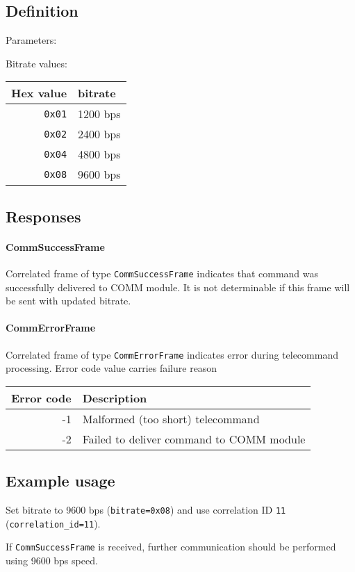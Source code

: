 \subsection{Definition}

Parameters: 

\begin{tcarglist}	
\end{tcarglist}

Bitrate values:

\begin{tabular}{r | l}
	Hex value & bitrate \\ \hline
	\texttt{0x01} & 1200 bps \\
	\texttt{0x02} & 2400 bps \\
	\texttt{0x04} & 4800 bps \\
	\texttt{0x08} & 9600 bps
\end{tabular}

\subsection{Responses}

\paragraph{CommSuccessFrame}

Correlated frame of type \texttt{CommSuccessFrame} indicates that command was successfully delivered to COMM module. It is not determinable if this frame will be sent with updated bitrate.

\paragraph{CommErrorFrame}

Correlated frame of type \texttt{CommErrorFrame} indicates error during telecommand processing. Error code value carries failure reason

\begin{tabular}{r | l}
	Error code & Description \\ \hline
	-1 		& Malformed (too short) telecommand \\
	-2 		& Failed to deliver command to COMM module
\end{tabular}

\subsection{Example usage}
Set bitrate to 9600 bps (\texttt{bitrate=0x08}) and use correlation ID \texttt{11} (\texttt{correlation\_id=11}).


If \texttt{CommSuccessFrame} is received, further communication should be performed using 9600 bps speed.